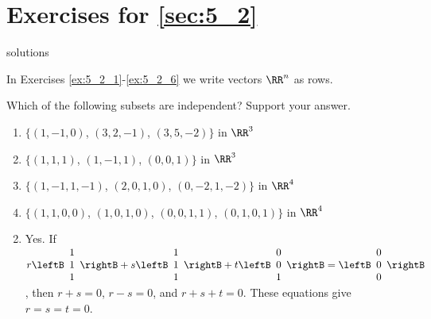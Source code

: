 \section*{Exercises for \ref{sec:5_2}}

\begin{Filesave}{solutions}
\end{Filesave}

\begin{multicols}{2}
\noindent In Exercises \ref{ex:5_2_1}-\ref{ex:5_2_6} we write vectors $\RR^n$ as rows.
\begin{ex}\label{ex:5_2_1}
Which of the following subsets are independent? Support your answer.

\begin{enumerate}[label={\alph*.}]
\item $\{(1, -1, 0)$, $(3, 2, -1)$, $(3, 5, -2)\}$ in $\RR^3$

\item $\{(1, 1, 1)$, $(1, -1, 1)$, $(0, 0, 1)\}$ in $\RR^3$

\item $\{(1, -1, 1, -1)$, $(2, 0, 1, 0)$, $(0, -2, 1, -2)\}$ in $\RR^4$

\item $\{(1, 1, 0, 0)$, $(1, 0, 1, 0)$, $(0, 0, 1, 1)$, $(0, 1, 0, 1)\}$ in $\RR^4$

\end{enumerate}
\begin{sol}
\begin{enumerate}[label={\alph*.}]
\setcounter{enumi}{1}
\item  Yes. If 
$r \leftB \begin{array}{r}
1 \\
1 \\
1
\end{array} \rightB
+ s
\leftB \begin{array}{r}
1 \\
1 \\
1
\end{array} \rightB
+ t
\leftB \begin{array}{r}
0 \\
0 \\
1
\end{array} \rightB
=
\leftB \begin{array}{r}
0 \\
0 \\
0
\end{array} \rightB$, then $r + s = 0$, $r - s = 0$, and $r + s + t = 0$. These equations give $r = s = t = 0$.


\end{enumerate}
\end{sol}
\end{ex}
\end{multicols}
